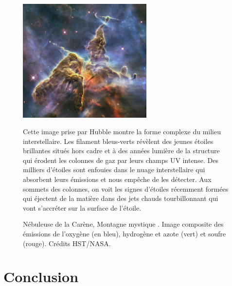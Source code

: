 \documentclass[11pt,a4paper]{article}
\begin{document}
\begin{spacing}{0.98}
\begin{figure}[!p]
    \centering
    \includegraphics[width = 0.6\textwidth]{figure/mystic.pdf}
    \caption{Nébuleuse de la Carène, \og Montagne mystique \fg{}. Image composite des émissions de l’oxygène (en bleu), hydrogène et azote (vert) et soufre (rouge). Crédits HST/NASA.}
    \vspace{1em}
    \begin{minipage}{\textwidth}
    Cette image prise par Hubble montre la forme complexe du milieu interstellaire. Les filament bleus-verts révèlent des jeunes étoiles brillantes situés hors cadre et à des années lumière de la structure qui érodent les colonnes de gaz par leurs champs UV intense. Des milliers d'étoiles sont enfouies dans le nuage interstellaire qui absorbent leurs émissions et nous empêche de les détecter. Aux sommets des colonnes, on voit les signes d'étoiles récemment formées qui éjectent de la matière dans des jets chauds tourbillonnant qui vont s'accréter sur la surface de l'étoile.
    \end{minipage}
    \label{fig:intro:mystic}
\end{figure}






\clearpage




\section*{Conclusion}

\clearpage



\clearpage





\end{spacing}
\end{document}
